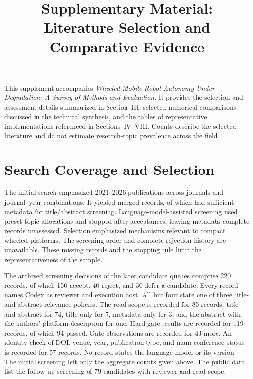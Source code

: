 \documentclass[journal]{IEEEtran}
\begin{document}
\raggedbottom
\title{Supplementary Material:\\Literature Selection and Comparative Evidence}
\author{}
\maketitle

This supplement accompanies \emph{Wheeled Mobile Robot Autonomy Under Degradation: A Survey of Methods and Evaluation}. It provides the selection and assessment details summarized in Section~III, selected numerical comparisons discussed in the technical synthesis, and the tables of representative implementations referenced in Sections~IV--VIII. Counts describe the selected literature and do not estimate research-topic prevalence across the field.

\section{Search Coverage and Selection}
\label{supp:selection}

The initial search emphasized 2021--2026 publications across \LegacyJournals{} journals and \LegacySlices{} journal--year combinations. It yielded \LegacyRecords{} merged records, of which \LegacyReviewable{} had sufficient metadata for title/abstract screening. Language-model-assisted screening used preset topic allocations and stopped after \BaselineCount{} acceptances, leaving \LegacyUnreviewed{} metadata-complete records unassessed. Selection emphasized mechanisms relevant to compact wheeled platforms. The screening order and complete rejection history are unavailable. These missing records and the stopping rule limit the representativeness of the sample.

The archived screening decisions of the later candidate queues comprise 220 records, of which 150 accept, 40 reject, and 30 defer a candidate. Every record names Codex as reviewer and execution host. All but four state one of three title-and-abstract relevance policies. The read scope is recorded for 85 records: title and abstract for 74, title only for 7, metadata only for 3, and the abstract with the authors' platform description for one. Hard-gate results are recorded for 119 records, of which 94 passed. Gate observations are recorded for 43 more. An identity check of DOI, venue, year, publication type, and main-conference status is recorded for 57 records. No record states the language model or its version. The initial screening left only the aggregate counts given above. The public data list the follow-up screening of 79 candidates with reviewer and read scope.
\end{document}
